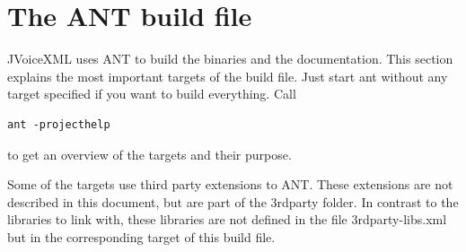 \documentclass[11pt,a4paper]{article}
\begin{document}
\section{The ANT build file}
\label{sec:ant-build-file}

JVoiceXML uses ANT to build the binaries and the documentation. This section
explains the most important targets of the build file. Just start ant 
without any target specified if you want to build everything.
Call 
\begin{lstlisting}
ant -projecthelp
\end{lstlisting}
to get an overview of the targets and their purpose.

Some of the targets use third party extensions to ANT. These 
extensions are not described in this document, but are part of
the 3rdparty folder. In contrast to the libraries to link with,
these libraries are not defined in the file 3rdparty-libs.xml
but in the corresponding target of this build file.
\end{document}
